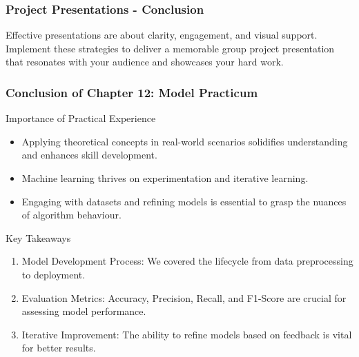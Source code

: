 \documentclass[aspectratio=169]{beamer}
\begin{document}
\begin{frame}[fragile]
    \frametitle{Project Presentations - Conclusion}
    Effective presentations are about clarity, engagement, and visual support. 
    Implement these strategies to deliver a memorable group project presentation that resonates with your audience and showcases your hard work.
\end{frame}

\begin{frame}[fragile]
    \frametitle{Conclusion of Chapter 12: Model Practicum}
    \begin{block}{Importance of Practical Experience}
        \begin{itemize}
            \item Applying theoretical concepts in real-world scenarios solidifies understanding and enhances skill development.
            \item Machine learning thrives on experimentation and iterative learning.
            \item Engaging with datasets and refining models is essential to grasp the nuances of algorithm behaviour.
        \end{itemize}
    \end{block}
    
    \begin{block}{Key Takeaways}
        \begin{enumerate}
            \item Model Development Process: We covered the lifecycle from data preprocessing to deployment.
            \item Evaluation Metrics: Accuracy, Precision, Recall, and F1-Score are crucial for assessing model performance.
            \item Iterative Improvement: The ability to refine models based on feedback is vital for better results.
        \end{enumerate}
    \end{block}
\end{frame}
\end{document}
